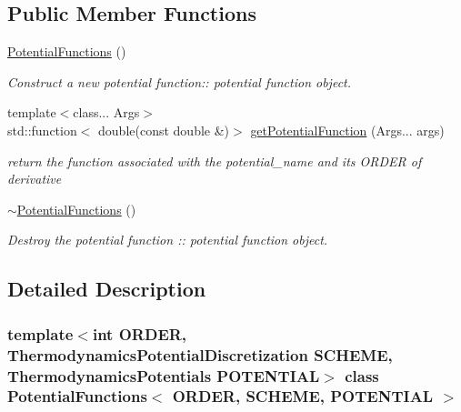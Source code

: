 \subsection*{Public Member Functions}
\begin{DoxyCompactItemize}
\item 
\mbox{\label{classPotentialFunctions_aad1e8b1d3f7860ab387b8e525f3ccd47}} 
\hyperlink{classPotentialFunctions_aad1e8b1d3f7860ab387b8e525f3ccd47}{Potential\+Functions} ()
\begin{DoxyCompactList}\small\item\em Construct a new potential function\+:\+: potential function object. \end{DoxyCompactList}\item 
{\footnotesize template$<$class... Args$>$ }\\std\+::function$<$ double(const double \&)$>$ \hyperlink{classPotentialFunctions_af7b46074a256a70b110ae621d0335874}{get\+Potential\+Function} (Args... args)
\begin{DoxyCompactList}\small\item\em return the function associated with the potential\+\_\+name and its O\+R\+D\+ER of derivative \end{DoxyCompactList}\item 
\mbox{\label{classPotentialFunctions_a8ef27db84ef1e3e01ad4a245ea9888da}} 
\hyperlink{classPotentialFunctions_a8ef27db84ef1e3e01ad4a245ea9888da}{$\sim$\+Potential\+Functions} ()
\begin{DoxyCompactList}\small\item\em Destroy the potential function \+:\+: potential function object. \end{DoxyCompactList}\end{DoxyCompactItemize}


\subsection{Detailed Description}
\subsubsection*{template$<$int O\+R\+D\+ER, Thermodynamics\+Potential\+Discretization S\+C\+H\+E\+ME, Thermodynamics\+Potentials P\+O\+T\+E\+N\+T\+I\+AL$>$\newline
class Potential\+Functions$<$ O\+R\+D\+E\+R, S\+C\+H\+E\+M\+E, P\+O\+T\+E\+N\+T\+I\+A\+L $>$}



